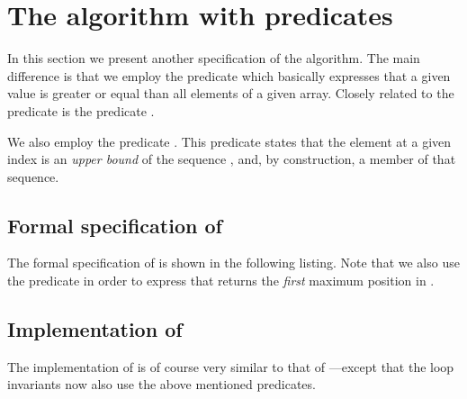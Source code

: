 
\section{The \maxelement algorithm with predicates}

In this section we present another specification of the \maxelement algorithm.
The main difference is that we employ the predicate 
which basically expresses that a given value is greater or equal than all
elements of a given array.
Closely related to the predicate \UpperBound is the predicate .

We also employ the predicate .
This predicate states that the element at a given index  is an 
\emph{upper bound} of the sequence , and, by
construction, a member of that sequence.

\subsection{Formal specification of \maxelementii}

The formal specification of  is shown in the following listing.
Note that we also use the predicate  
in order to express that \maxelementii returns the \emph{first} maximum position in .



\clearpage

\subsection{Implementation of \maxelementii}

The implementation of  is of course
very similar to that of ---except that the
loop invariants now also use the above mentioned predicates.



\clearpage

